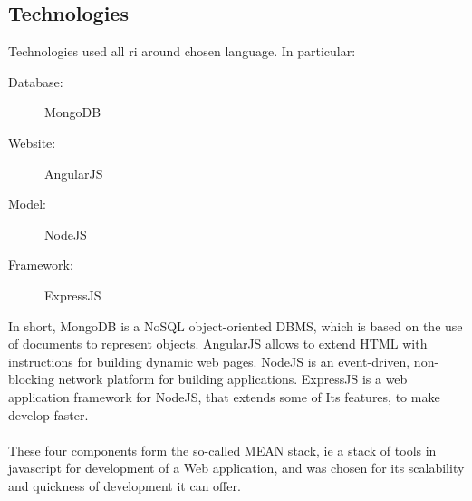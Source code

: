 \subsection{Technologies}
Technologies used all ri around chosen language. In particular:
\begin{description}
  \item[Database:] MongoDB
  \item[Website:] AngularJS
  \item[Model:] NodeJS
  \item[Framework:] ExpressJS
\end{description}
In short, MongoDB is a NoSQL object-oriented DBMS, which is based on the use of documents to represent objects. AngularJS allows to extend HTML with instructions for building dynamic web pages. NodeJS is an event-driven, non-blocking network platform for building applications. ExpressJS is a web application framework for NodeJS, that extends some of Its features, to make develop faster. \\
\\These four components form the so-called MEAN stack, ie a stack of tools in javascript for development of a Web application, and was chosen for its scalability and quickness of development it can offer.
